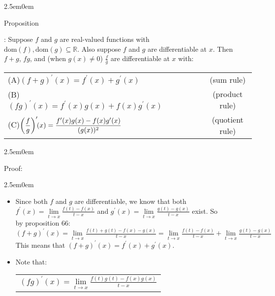 \documentclass{book}
\newcommand{\hTwo}{%
   \color{MidnightBlue}%
   \fontsize{13}{15}\selectfont%
}
\newcommand{\hThree}{%
   \color{PineGreen!85!Orange}
   \fontsize{13}{15}\selectfont%
}
\newcommand{\hFour}{%
   \color{Cerulean}
   \fontsize{12}{14}\selectfont%
}
\newenvironment{myIndent}{%
   \begin{adjustwidth}{2.5em}{0em}%
}{%
   \end{adjustwidth}%
}
\newcommand{\domain}[1]{\mathrm{dom}(#1)}
\newcounter{PropNumber}
\newcommand{\propCount}[1][1]{%
   \addtocounter{PropNumber}{#1}%
   \thePropNumber%
}
\newcommand{\retTwo}{\hfill\bigbreak}
\begin{document}
\newpage

{\begin{myIndent}\hTwo
   Proposition \propCount: Suppose $f$ and $g$ are real-valued functions with\\ $\domain{f}, \domain{g} \subseteq \mathbb{R}$. Also suppose $f$ and $g$ are differentiable at $x$. Then\\ $f + g$, $fg$, and (when $g(x) \neq 0$) $\frac{f}{g}$ are differentiable at $x$ with:\\
   
   \begin{tabular}{l c c c c c}
      (A)\quad\quad $(f + g)^\prime(x) = f^\prime(x) + g^\prime(x)$ & &&&&{\hFour(sum rule)} \\ [4pt]
      (B)\quad\quad $(fg)^\prime(x) = f^\prime(x)g(x) + f(x)g^\prime(x)$ & &&&& {\hFour(product rule)} \\ [4pt]
      (C)\quad\quad $\left(\dfrac{f}{g}\right)^\prime\hspace{-0.3em}(x) = \dfrac{f^\prime(x)g(x) - f(x)g^\prime(x)}{(g(x))^2}$ & &&&& {\hFour(quotient rule)}
   \end{tabular}\retTwo

   \begin{myIndent}\hThree
      Proof:
      \begin{myIndent}
         \begin{itemize}
            \item[(A)] Since both $f$ and $g$ are differentiable, we know that both\\ $f^\prime(x) = \lim\limits_{t\rightarrow x}\frac{f(t) - f(x)}{t - x}$ and $g^\prime(x) = \lim\limits_{t\rightarrow x}\frac{g(t) - g(x)}{t - x}$ exist. So\\ by proposition 66:\\ [-11pt]
            
            \hspace{-1.5em}${(f + g)^\prime(x) = \lim\limits_{t\rightarrow x}\frac{f(t) + g(t) - f(x) - g(x)}{t-x} = \lim\limits_{t\rightarrow x}\frac{f(t) - f(x)}{t - x} + \lim\limits_{t\rightarrow x}\frac{g(t) - g(x)}{t - x}}$\\ [4pt]

            This means that $(f + g)^\prime(x) = f^\prime(x) + g^\prime(x)$.\\ [-2pt]

            \item[(B)] Note that:\\
            \begin{tabular}{l}
               $(fg)^\prime(x) = \lim\limits_{t\rightarrow x}\frac{f(t)g(t) - f(x)g(x)}{t-x}$ \\


\end{tabular}
\end{itemize}
\end{myIndent}
\end{myIndent}
\end{myIndent}}
\end{document}
